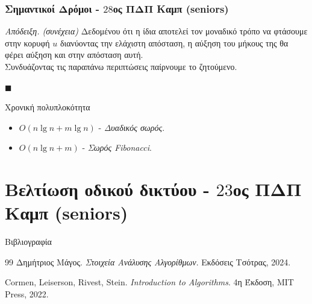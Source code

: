 \documentclass[t]{beamer}
\begin{document}
\begin{frame}
	\frametitle{Σημαντικοί Δρόμοι - $28$ος ΠΔΠ Καμπ (seniors)}
	\begin{block}{\emph{Απόδειξη. (συνέχεια)}}
		Δεδομένου ότι η ίδια αποτελεί τον μοναδικό τρόπο να φτάσουμε στην κορυφή $u$ διανύοντας την ελάχιστη απόσταση, η αύξηση του μήκους της θα φέρει αύξηση και στην απόσταση αυτή. 
		\pause
		\\
		\vspace{0.25cm}
		Συνδυάζοντας τις παραπάνω περιπτώσεις παίρνουμε το ζητούμενο. 
		\begin{flushright}
			$\blacksquare$
		\end{flushright}
	\end{block}
	\pause
	\begin{block}{Χρονική πολυπλοκότητα}
		\begin{itemize}
			\item $O(n \lg n + m \lg n)$ - \emph{Δυαδικός σωρός}. 
			\item $O(n \lg n + m)$ - \emph{Σωρός Fibonacci}.
		\end{itemize}
	\end{block}
	\pause
	\vspace{0.25cm}
	\begin{center}
	\end{center}
\end{frame}

\section{Βελτίωση οδικού δικτύου - $23$ος ΠΔΠ Καμπ (seniors)}

\begin{frame}{Βιβλιογραφία}
\begin{thebibliography}{99}
	Δημήτριος Μάγος.
	\textit{Στοιχεία Ανάλυσης Αλγορίθμων}.
	Εκδόσεις Τσότρας, 2024.

	Cormen, Leiserson, Rivest, Stein.
	\textit{Introduction to Algorithms}. 4η Έκδοση, MIT Press, 2022.
\end{thebibliography}
\end{frame}
\end{document}
